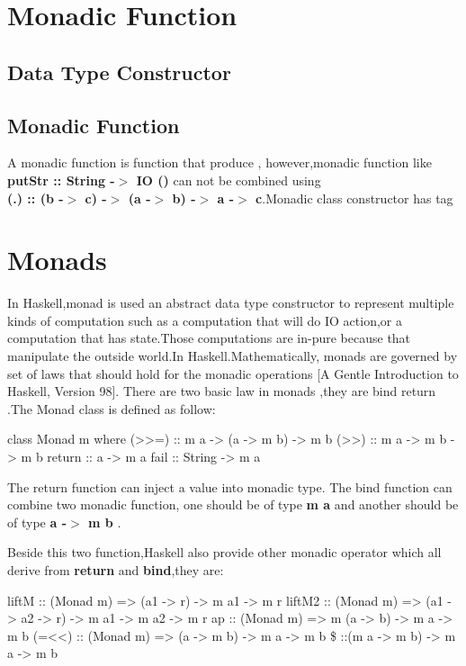 \section{Monadic Function}
\subsection{Data Type Constructor}

\subsection{Monadic Function}
A monadic function is function that produce , however,monadic function like \textbf{putStr :: String -$>$ IO ()} can not be combined using \\ \textbf{(.) :: (b -$>$ c) -$>$ (a -$>$ b) -$>$ a -$>$ c}.Monadic class constructor has tag 



\section{Monads}
In Haskell,monad is used an abstract data type constructor to represent multiple kinds of computation such as a computation that will do IO action,or a computation that has state.Those computations are in-pure because that manipulate the outside world.In Haskell.Mathematically, monads are governed by set of laws that should hold for the monadic operations [A Gentle Introduction to Haskell, Version 98]. There are two basic law in monads ,they are bind return .The Monad class is defined as follow:
\begin{hcode}
class Monad m where
  (>>=) :: m a -> (a -> m b) -> m b
  (>>) :: m a -> m b -> m b
  return :: a -> m a
  fail :: String -> m a
\end{hcode}

The return function can inject a value into monadic type.
The bind function can combine two monadic function, one should be of type \textbf{m a} and another should be of type \textbf{a -$>$ m b} .

Beside this two function,Haskell also provide other monadic operator which all derive from \textbf{return} and \textbf{bind},they are:
\begin{hexample}
liftM :: (Monad m) => (a1 -> r) -> m a1 -> m r
liftM2  :: (Monad m) => (a1 -> a2 -> r) -> m a1 -> m a2 -> m r
ap :: (Monad m) => m (a -> b) -> m a -> m b
(=<<) :: (Monad m) => (a -> m b) -> m a -> m b
\$ ::(m a -> m b) -> m a -> m b 
\end{hexample}

